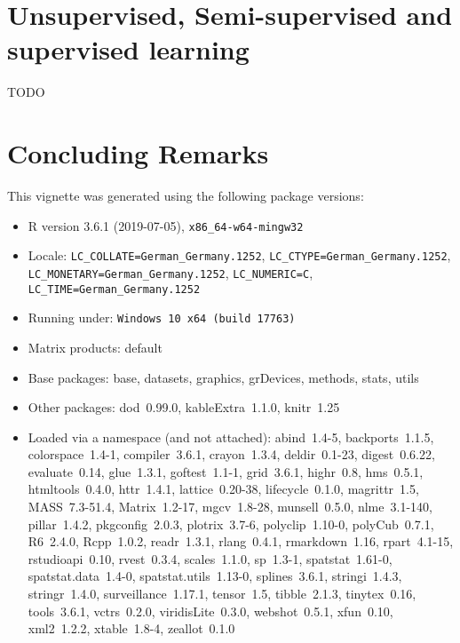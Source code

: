 \documentclass[a4paper]{article}\usepackage[]{graphicx}\usepackage[]{color}
\newcommand{\Rpackage}[1]{{\textit{#1}}}
\begin{document}
\section{Unsupervised, Semi-supervised and supervised learning}
TODO





\section{Concluding Remarks}
This vignette was generated using the following package versions:

\begin{itemize}\raggedright
  \item R version 3.6.1 (2019-07-05), \verb|x86_64-w64-mingw32|
  \item Locale: \verb|LC_COLLATE=German_Germany.1252|, \verb|LC_CTYPE=German_Germany.1252|, \verb|LC_MONETARY=German_Germany.1252|, \verb|LC_NUMERIC=C|, \verb|LC_TIME=German_Germany.1252|
  \item Running under: \verb|Windows 10 x64 (build 17763)|
  \item Matrix products: default
  \item Base packages: base, datasets, graphics, grDevices,
    methods, stats, utils
  \item Other packages: dod~0.99.0, kableExtra~1.1.0, knitr~1.25
  \item Loaded via a namespace (and not attached): abind~1.4-5,
    backports~1.1.5, colorspace~1.4-1, compiler~3.6.1,
    crayon~1.3.4, deldir~0.1-23, digest~0.6.22, evaluate~0.14,
    glue~1.3.1, goftest~1.1-1, grid~3.6.1, highr~0.8, hms~0.5.1,
    htmltools~0.4.0, httr~1.4.1, lattice~0.20-38, lifecycle~0.1.0,
    magrittr~1.5, MASS~7.3-51.4, Matrix~1.2-17, mgcv~1.8-28,
    munsell~0.5.0, nlme~3.1-140, pillar~1.4.2, pkgconfig~2.0.3,
    plotrix~3.7-6, polyclip~1.10-0, polyCub~0.7.1, R6~2.4.0,
    Rcpp~1.0.2, readr~1.3.1, rlang~0.4.1, rmarkdown~1.16,
    rpart~4.1-15, rstudioapi~0.10, rvest~0.3.4, scales~1.1.0,
    sp~1.3-1, spatstat~1.61-0, spatstat.data~1.4-0,
    spatstat.utils~1.13-0, splines~3.6.1, stringi~1.4.3,
    stringr~1.4.0, surveillance~1.17.1, tensor~1.5, tibble~2.1.3,
    tinytex~0.16, tools~3.6.1, vctrs~0.2.0, viridisLite~0.3.0,
    webshot~0.5.1, xfun~0.10, xml2~1.2.2, xtable~1.8-4,
    zeallot~0.1.0
\end{itemize}










%
\end{document}
